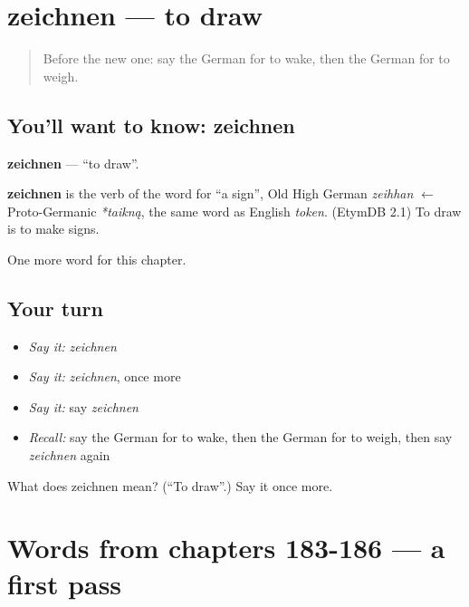 \section[zeichnen]{zeichnen — to draw}

\label{lesson:GE-C191-zeichnen}



\begin{quote}
Before the new one: say the German for to wake, then the German for to weigh.
\end{quote}

\subsection*{You'll want to know: zeichnen}
\textbf{zeichnen} — \textquotedblleft{}to draw\textquotedblright{}.

\begin{cousinweb}
\textbf{zeichnen} is the verb of the word for \textquotedblleft{}a sign\textquotedblright{}, Old High German \emph{zeihhan} $\leftarrow$ Proto-Germanic \emph{*taikną}, the same word as English \emph{token}. (EtymDB 2.1) To draw is to make signs.
\end{cousinweb}

\begin{grammarlens}[title={What you've built}]
One more word for this chapter.
\end{grammarlens}

\subsection*{Your turn}
\begin{itemize}
\raggedright
  \item \emph{Say it:} \emph{zeichnen}
  \item \emph{Say it:} \emph{zeichnen}, once more
  \item \emph{Say it:} say \emph{zeichnen}
  \item \emph{Recall:} say the German for to wake, then the German for to weigh, then say \emph{zeichnen} again
\end{itemize}

\begin{tcolorbox}[breakable,colback=teal!4,colframe=teal!35!black,title={Before you move on}]
What does zeichnen mean? (\textquotedblleft{}To draw\textquotedblright{}.) Say it once more.
\end{tcolorbox}
\section[(dialogue)]{Words from chapters 183-186 — a first pass}

